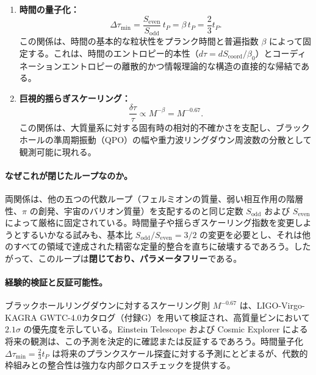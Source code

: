 \documentclass[12pt,a4paper]{article}
\begin{document}
	\begin{enumerate}
		\item \textbf{時間の量子化：} 
		\begin{equation}
			\Delta \tau_{\min} = \frac{S_{\mathrm{even}}}{S_{\mathrm{odd}}} \, t_P = \beta \, t_P = \frac{2}{3} t_P.
			\label{eq:loop6-quantization}
		\end{equation}
		この関係は、時間の基本的な粒状性をプランク時間と普遍指数 \(\beta\) によって固定する。これは、時間のエントロピー的本性（\(d\tau = dS_{\mathrm{coord}} / \beta_0\)）とコーディネーションエントロピーの離散的かつ情報理論的な構造の直接的な帰結である。
		
		\item \textbf{巨視的揺らぎスケーリング：}
		\begin{equation}
			\frac{\delta \tau}{\tau} \propto M^{-\beta} = M^{-0.67}.
			\label{eq:loop6-fluctuation}
		\end{equation}
		この関係は、大質量系に対する固有時の相対的不確かさを支配し、ブラックホールの準周期振動（QPO）の幅や重力波リングダウン周波数の分散として観測可能に現れる。
	\end{enumerate}
	
	\paragraph{なぜこれが閉じたループなのか。}
	両関係は、他の五つの代数ループ（フェルミオンの質量、弱い相互作用の階層性、\(\pi\) の創発、宇宙のバリオン質量）を支配するのと同じ定数 \(S_{\mathrm{odd}}\) および \(S_{\mathrm{even}}\) によって厳格に固定されている。時間量子や揺らぎスケーリング指数を変更しようとするいかなる試みも、基本比 \(S_{\mathrm{odd}}/S_{\mathrm{even}} = 3/2\) の変更を必要とし、それは他のすべての領域で達成された精密な定量的整合を直ちに破壊するであろう。したがって、このループは\textbf{閉じており、パラメータフリー}である。
	
	\paragraph{経験的検証と反証可能性。}
	ブラックホールリングダウンに対するスケーリング則 \(M^{-0.67}\) は、LIGO-Virgo-KAGRA GWTC-4.0カタログ（付録G）を用いて検証され、高質量ビンにおいて \(2.1\sigma\) の優先度を示している。Einstein Telescope および Cosmic Explorer による将来の観測は、この予測を決定的に確認または反証するであろう。時間量子化 \(\Delta \tau_{\min} = \frac{2}{3} t_P\) は将来のプランクスケール探査に対する予測にとどまるが、代数的枠組みとの整合性は強力な内部クロスチェックを提供する。
	
\end{document}
